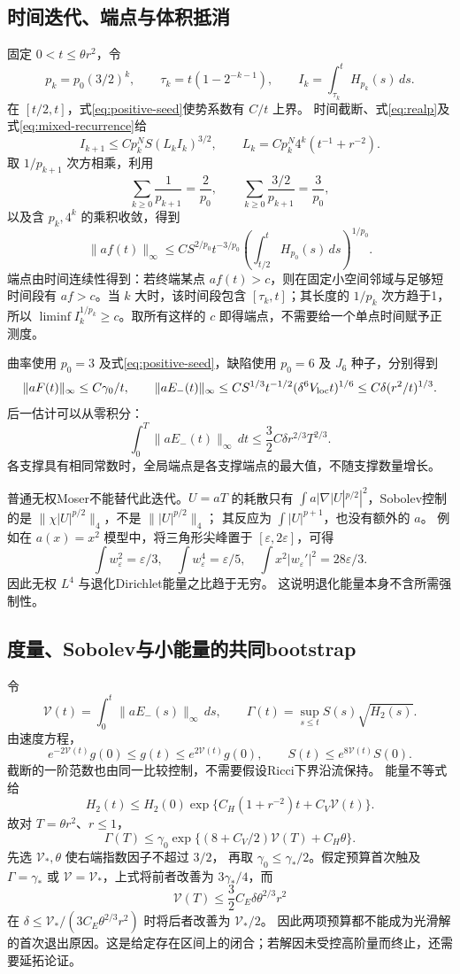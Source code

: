 \documentclass[UTF8,a4paper,11pt,fontset=fandol]{ctexart}
\numberwithin{equation}{section}
\theoremstyle{definition}
\begin{document}
\subsection{时间迭代、端点与体积抵消}
固定 $0<t\le\theta r^2$，令
\[
p_k=p_0(3/2)^k,\qquad
\tau_k=t(1-2^{-k-1}),\qquad
I_k=\int_{\tau_k}^{t}H_{p_k}(s)\,ds.
\]
在 $[t/2,t]$，式\eqref{eq:positive-seed}使势系数有 $C/t$ 上界。
时间截断、式\eqref{eq:realp}及式\eqref{eq:mixed-recurrence}给
\[
I_{k+1}\le Cp_k^N S(L_kI_k)^{3/2},\qquad
L_k=Cp_k^N4^k(t^{-1}+r^{-2}).
\]
取 $1/p_{k+1}$ 次方相乘，利用
\[
\sum_{k\ge0}\frac1{p_{k+1}}=\frac2{p_0},\qquad
\sum_{k\ge0}\frac{3/2}{p_{k+1}}=\frac3{p_0},
\]
以及含 $p_k,4^k$ 的乘积收敛，得到
\begin{equation}\label{eq:weighted-endpoint}
\|af(t)\|_\infty
\le CS^{2/p_0}t^{-3/p_0}
\left(\int_{t/2}^{t}H_{p_0}(s)\,ds\right)^{1/p_0}.
\end{equation}
端点由时间连续性得到：若终端某点 $af(t)>c$，则在固定小空间邻域与足够短时间段有 $af>c$。当 $k$ 大时，该时间段包含 $[\tau_k,t]$；其长度的 $1/p_k$ 次方趋于1，所以 $\liminf I_k^{1/p_k}\ge c$。取所有这样的 $c$ 即得端点，不需要给一个单点时间赋予正测度。

曲率使用 $p_0=3$ 及式\eqref{eq:positive-seed}，缺陷使用 $p_0=6$ 及 $J_6$ 种子，分别得到
\[
\|aF(t)\|_\infty\le C\gamma_0/t,\qquad
\|aE_-(t)\|_\infty
\le CS^{1/3}t^{-1/2}(\delta^6V_{\rm loc}t)^{1/6}
\le C\delta(r^2/t)^{1/3}.
\]
后一估计可以从零积分：
\[
\int_0^T\|aE_-(t)\|_\infty\,dt
\le\frac32C\delta r^{2/3}T^{2/3}.
\]
各支撑具有相同常数时，全局端点是各支撑端点的最大值，不随支撑数量增长。

普通无权Moser不能替代此迭代。$U=aT$ 的耗散只有
$\int a|\nabla|U|^{p/2}|^2$，Sobolev控制的是
$\|\chi|U|^{p/2}\|_4$，不是 $\||U|^{p/2}\|_4$；
其反应为 $\int|U|^{p+1}$，也没有额外的 $a$。
例如在 $a(x)=x^2$ 模型中，将三角形尖峰置于 $[\varepsilon,2\varepsilon]$，可得
\[
\int w_\varepsilon^2=\varepsilon/3,\quad
\int w_\varepsilon^4=\varepsilon/5,\quad
\int x^2|w_\varepsilon'|^2=28\varepsilon/3.
\]
因此无权 $L^4$ 与退化Dirichlet能量之比趋于无穷。
这说明退化能量本身不含所需强制性。

\subsection{度量、Sobolev与小能量的共同bootstrap}
令
\[
\mathcal V(t)=\int_0^t\|aE_-(s)\|_\infty\,ds,\qquad
\Gamma(t)=\sup_{s\le t}S(s)\sqrt{H_2(s)}.
\]
由速度方程，
\[
e^{-2\mathcal V(t)}g(0)\le g(t)\le e^{2\mathcal V(t)}g(0),
\qquad S(t)\le e^{8\mathcal V(t)}S(0).
\]
截断的一阶范数也由同一比较控制，不需要假设Ricci下界沿流保持。
能量不等式给
\[
H_2(t)\le H_2(0)\exp\{C_H(1+r^{-2})t+C_V\mathcal V(t)\}.
\]
故对 $T=\theta r^2$、$r\le1$，
\[
\Gamma(T)\le\gamma_0
\exp\{(8+C_V/2)\mathcal V(T)+C_H\theta\}.
\]
先选 $\mathcal V_*,\theta$ 使右端指数因子不超过 $3/2$，
再取 $\gamma_0\le\gamma_*/2$。假定预算首次触及
$\Gamma=\gamma_*$ 或 $\mathcal V=\mathcal V_*$，上式将前者改善为
$3\gamma_*/4$，而
\[
\mathcal V(T)\le\frac32C_E\delta\theta^{2/3}r^2
\]
在 $\delta\le\mathcal V_*/(3C_E\theta^{2/3}r^2)$ 时将后者改善为 $\mathcal V_*/2$。
因此两项预算都不能成为光滑解的首次退出原因。这是给定存在区间上的闭合；若解因未受控高阶量而终止，还需要延拓论证。
\end{document}

